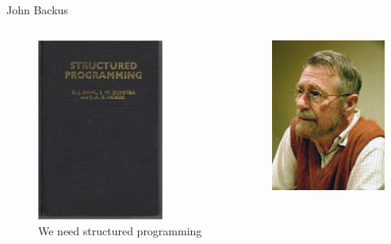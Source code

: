 \documentclass[10pt]{beamer}
\begin{document}
\begin{frame}{John Backus}
    \begin{columns}
        \begin{column}{0.6\textwidth}
            \begin{figure}
    	        \includegraphics[height=6cm]{images/structured_programming.jpg}
	    	    \caption{We need structured programming}
            \end{figure}
        \end{column}
        \begin{column}{0.4\textwidth}  %
                \begin{center}
					\includegraphics[height=5cm]{images/dijstra.jpg}
                \end{center}
        \end{column}
    \end{columns}
\end{frame}
\end{document}
